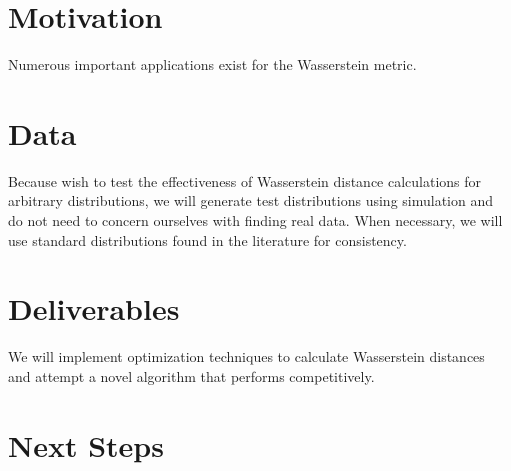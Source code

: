 \documentclass[a4paper]{amsart}
\begin{document}
\section{Motivation}

Numerous important applications exist for the Wasserstein metric. 

\section{Data}

Because wish to test the effectiveness of Wasserstein distance calculations for
arbitrary distributions, we will generate test distributions using simulation
and do not need to concern ourselves with finding real data. When necessary, we
will use standard distributions found in the literature for consistency.

\section{Deliverables}

We will implement optimization techniques to calculate Wasserstein distances and
attempt a novel algorithm that performs competitively.

\section{Next Steps}

\end{document}
